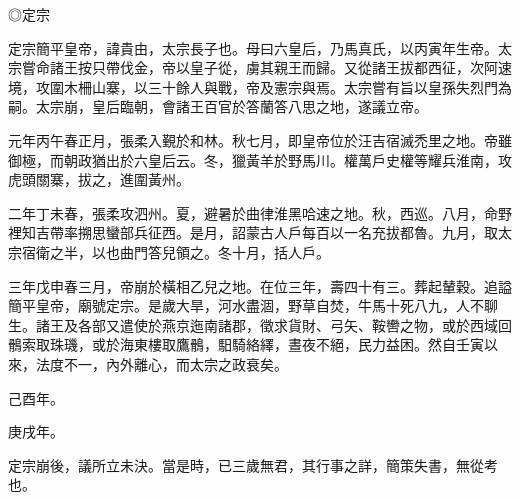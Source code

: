 \begin{pinyinscope}
 ◎定宗



 定宗簡平皇帝，諱貴由，太宗長子也。母曰六皇后，乃馬真氏，以丙寅年生帝。太宗嘗命諸王按只帶伐金，帝以皇子從，虜其親王而歸。又從諸王拔都西征，次阿速境，攻圍木柵山寨，以三十餘人與戰，帝及憲宗與焉。太宗嘗有旨以皇孫失烈門為嗣。太宗崩，皇后臨朝，會諸王百官於答蘭答八思之地，遂議立帝。



 元年丙午春正月，張柔入覲於和林。秋七月，即皇帝位於汪吉宿滅禿里之地。帝雖御極，而朝政猶出於六皇后云。冬，獵黃羊於野馬川。權萬戶史權等耀兵淮南，攻虎頭關寨，拔之，進圍黃州。



 二年丁未春，張柔攻泗州。夏，避暑於曲律淮黑哈速之地。秋，西巡。八月，命野裡知吉帶率搠思蠻部兵征西。是月，詔蒙古人戶每百以一名充拔都魯。九月，取太宗宿衛之半，以也曲門答兒領之。冬十月，括人戶。



 三年戊申春三月，帝崩於橫相乙兒之地。在位三年，壽四十有三。葬起輦穀。追謚簡平皇帝，廟號定宗。是歲大旱，河水盡涸，野草自焚，牛馬十死八九，人不聊生。諸王及各部又遣使於燕京迤南諸郡，徵求貨財、弓矢、鞍轡之物，或於西域回鶻索取珠璣，或於海東樓取鷹鶻，馹騎絡繹，晝夜不絕，民力益困。然自壬寅以來，法度不一，內外離心，而太宗之政衰矣。



 己酉年。



 庚戌年。



 定宗崩後，議所立未決。當是時，已三歲無君，其行事之詳，簡策失書，無從考也。



\end{pinyinscope}